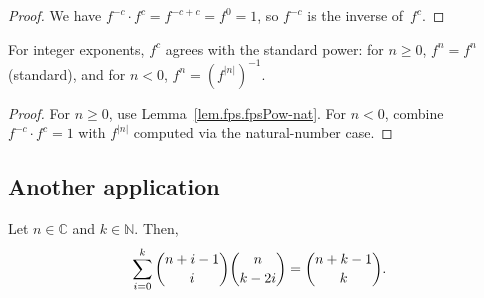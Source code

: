 \begin{proof}
\leanok
We have $f^{-c}\cdot f^c = f^{-c+c} = f^0 = 1$, so $f^{-c}$ is the
inverse of~$f^c$.
\end{proof}

\begin{lemma}
\label{lem.fps.fpsPow-int}
\leanhelper
\leanok
For integer exponents, $f^c$ agrees with the standard power:
for $n\ge 0$, $f^n = f^n$ (standard), and for $n<0$, $f^n = (f^{|n|})^{-1}$.
\end{lemma}

\begin{proof}
\leanok
For $n\ge 0$, use Lemma~\ref{lem.fps.fpsPow-nat}.
For $n<0$, combine $f^{-c}\cdot f^c = 1$ with $f^{|n|}$ computed via the natural-number case.
\end{proof}

\subsection{Another application}

\begin{proposition}
\label{prop.binom.nCk-2i-qedmo.CN}
\leantarget
\leanok
Let $n\in\mathbb{C}$ and $k\in\mathbb{N}$.
Then,%
\[
\sum_{i=0}^{k}\dbinom{n+i-1}{i}\dbinom{n}{k-2i}=\dbinom{n+k-1}{k}.
\]
\end{proposition}

